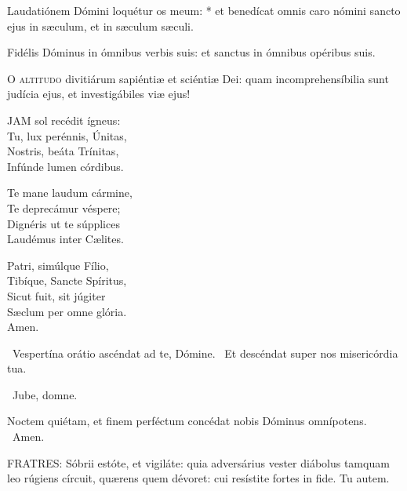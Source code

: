 Laudatiónem Dómini loquétur os meum: * et benedícat omnis caro nómini sancto ejus in sæculum, et in sæculum sæculi.

 Fidélis Dóminus in ómnibus verbis suis: et sanctus in ómnibus opéribus suis.




\lettrine[lines=2]{O}{} \textsc{altitudo} divitiárum sapiéntiæ et sciéntiæ Dei: quam incomprehensíbilia sunt judícia ejus, et investigábiles viæ ejus!


\lettrine[lines=2]{J}{AM} sol recédit ígneus:\\
Tu, lux perénnis, Únitas,\\
Nostris, beáta Trínitas,\\
Infúnde lumen córdibus.

Te mane laudum cármine,\\
Te deprecámur véspere;\\
Dignéris ut te súpplices\\
Laudémus inter Cælites.

Patri, simúlque Fílio,\\
Tibíque, Sancte Spíritus,\\
Sicut fuit, sit júgiter\\
Sæclum per omne glória.\\
Amen.

\V\ Vespertína orátio ascéndat ad te, Dómine. \R\ Et descéndat super nos misericórdia tua.





\V\ Jube, domne.

 Noctem quiétam, et finem perféctum concédat nobis Dóminus omnípotens. \R\ Amen.


\lettrine[lines=2]{F}{RATRES}: Sóbrii estóte, et vigiláte: quia adversárius vester diábolus tamquam leo rúgiens círcuit, quærens quem dévoret: cui resístite fortes in fide. Tu autem.

